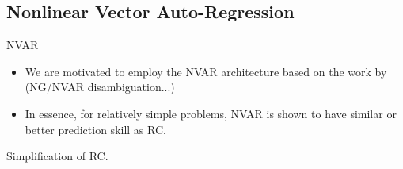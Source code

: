 \subsection{Nonlinear Vector Auto-Regression}
\label{subsec:nvar}

NVAR
\begin{itemize}
    \item We are motivated to employ the NVAR architecture based on the work by
        \citep{gauthier_next_2021} (NG/NVAR disambiguation...)
    \item In essence, for relatively simple problems, NVAR is shown to have
        similar or better prediction skill as RC.
\end{itemize}

Simplification of RC.

